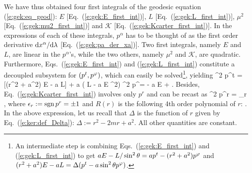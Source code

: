 We have thus obtained four first integrals of the geodesic equation
(\ref{e:gek:eq_geod}):
$E$ [Eq.~(\ref{e:gek:E_first_int})], $L$ [Eq.~(\ref{e:gek:L_first_int})],
$\mu^2$ [Eq.~(\ref{e:gek:mu2_first_int})] and $\mathscr{K}$
[Eq.~(\ref{e:gek:Kcarter_first_int})]. In the expressions of each of these integrals,
$p^\alpha$ has to be thought of as the first order derivative $\mathrm{d} x^\alpha/\mathrm{d}\lambda$
[Eq.~(\ref{e:gek:pa_der_xa})].
Two first integrals, namely $E$ and $L$, are linear in the $p^\alpha$'s, while
the two others, namely $\mu^2$ and $\mathscr{K}$, are quadratic.
Furthermore, Eqs.~(\ref{e:gek:E_first_int}) and (\ref{e:gek:L_first_int})
constitute a decoupled subsystem for $(p^t, p^\varphi)$, which can easily be solved\footnote{An
intermediate step is combining  Eqs.~(\ref{e:gek:E_first_int}) and (\ref{e:gek:L_first_int})
to get $a E - L /\sin^2\theta = a p^t - (r^2 + a^2) p^\varphi$
and $(r^2 + a^2) E - a L = \Delta(p^t - a\sin^2\theta p^\varphi)$.},
yielding
\be \label{e:gek:rho2_pt}
    \rho^2 p^t =  [(r^2 + a^2) E - a L] + a ( L - a E \sin^2\th )
\ee
\be  \label{e:gek:rho2_pph}
    \rho^2 p^\ph =  - a E
    + \left[(r^2 + a^2) E - a L\right] .
\ee
Besides, Eq.~(\ref{e:gek:Kcarter_first_int}) involves only $p^r$ and can
be recast as
\be \label{e:gek:p_r_R}
    \rho^2 p^r = \eps_r  ,
\ee
where $\epsilon_r := \operatorname{sgn} p^r = \pm 1$ and
$R(r)$ is the following 4th order polynomial of $r$:
\be \label{e:gek:def_R}
   .
\ee
In the above expression, let us recall that $\Delta$ is the function of $r$
given by Eq.~(\ref{e:ker:def_Delta}): $\Delta := r^2 - 2 m r + a^2$. All other
quantities are constant.

